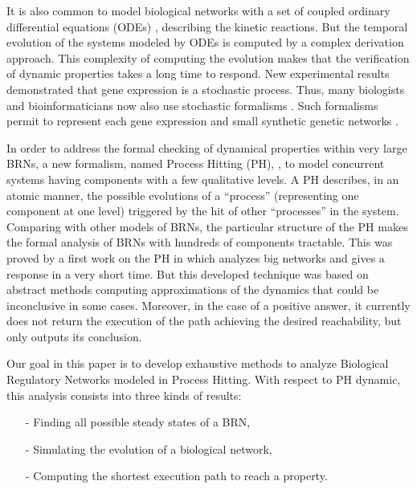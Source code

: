 It is also common to model biological networks with a set of coupled ordinary differential equations (ODEs) \cite{chu2009models}, describing the kinetic reactions. But the temporal evolution of the systems modeled by ODEs is computed by a complex derivation approach. This complexity of computing the evolution makes that the verification of dynamic properties takes a long time to respond. 
New experimental results \cite{elowitz2002stochastic, blake2003noise} demonstrated that gene expression is a stochastic process. Thus, many biologists and bioinformaticians now also use stochastic formalisms \cite{arkin1998stochastic, tian2006stochastic, wang2010robust}. Such formalisms permit to represent each gene expression \cite{raser2005noise} and small synthetic genetic networks \cite{elowitz2000synthetic, gardner2000construction}.

In order to address the formal checking of dynamical properties within very large BRNs, a new formalism, named Process Hitting (PH), \cite{PMR10-TCSB}, to model concurrent systems having components with a few qualitative levels. A PH describes, in an atomic manner, the possible evolutions of a ``process'' (representing one component at one level) triggered by the hit of other ``processes'' in the system. Comparing with other models of BRNs, the particular structure of the PH makes the formal analysis of BRNs with hundreds of components tractable. This was proved by a first work on the PH in \cite{PMR12-MSCS} which analyzes big networks and gives a response in a very short time. But this developed technique was based on abstract methods computing approximations of the dynamics that could be inconclusive in some cases. Moreover, in the case of a positive answer, it currently does not return the execution of the path achieving the desired reachability, but only outputs its conclusion.

Our goal in this paper is to develop exhaustive methods to analyze Biological Regulatory Networks modeled in Process Hitting. With respect to PH dynamic, this analysis consists into three kinds of results:
\begin{itemize}
\item[-] Finding all possible steady states of a BRN,
\item[-] Simulating the evolution of a biological network,
\item[-] Computing the shortest execution path to reach a property.
\end{itemize}

